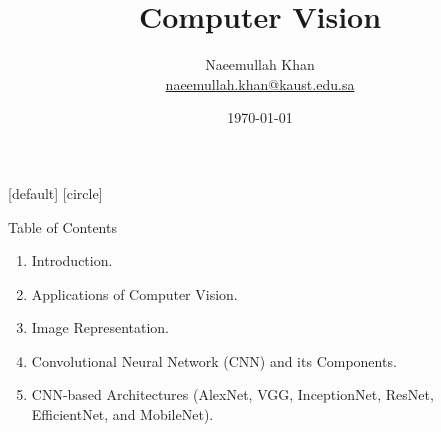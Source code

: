 \documentclass[10pt]{beamer}
\title[Computer Vision]{Computer Vision}
\theoremstyle{remark}
\theoremstyle{definition}
\begin{document}
\author[KAUST Academy]{
	\begin{tabular}{c} 
	\Large
	Naeemullah Khan\\
    \footnotesize \href{mailto:naeemullah.khan@kaust.edu.sa}{naeemullah.khan@kaust.edu.sa}
\end{tabular}
\vspace{-4ex}}


\date{\today}

\begin{noheadline}
\begin{frame}\maketitle\end{frame}
\end{noheadline}


[default]
[circle]

\begin{frame}{Table of Contents}
\begin{enumerate}
    \item Introduction.
    \item Applications of Computer Vision.
    \item Image Representation.
    \item Convolutional Neural Network (CNN) and its Components.
    \item CNN-based Architectures (AlexNet, VGG, InceptionNet, ResNet, EfficientNet, and MobileNet).
\end{enumerate}
\end{frame}
\end{document}
